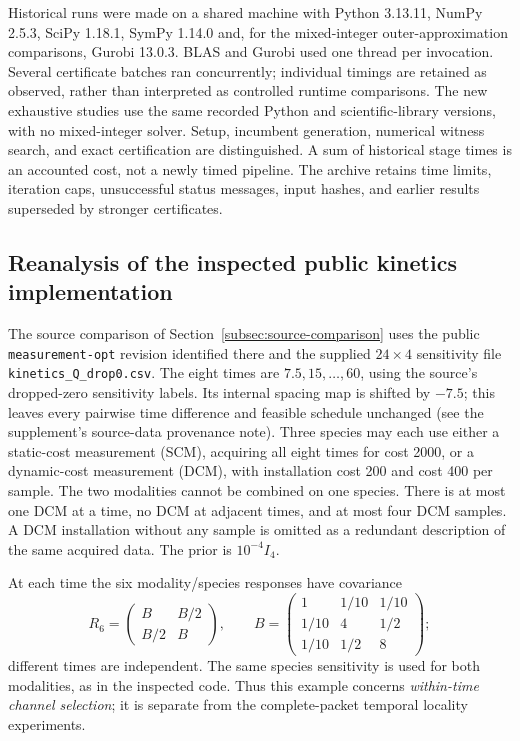 Historical runs were made on a shared machine with Python 3.13.11,
NumPy 2.5.3, SciPy 1.18.1, SymPy 1.14.0 and, for the mixed-integer
outer-approximation comparisons, Gurobi 13.0.3. BLAS and Gurobi used one thread
per invocation. Several certificate batches ran concurrently; individual
timings are retained as observed, rather than interpreted as controlled runtime
comparisons. The new exhaustive studies use the same recorded Python and
scientific-library versions, with no mixed-integer solver. Setup, incumbent
generation, numerical witness search, and exact certification are distinguished.
A sum of historical stage times is an accounted cost, not a newly timed pipeline.
The archive retains time limits, iteration caps, unsuccessful status messages,
input hashes, and earlier results superseded by stronger certificates.

\subsection{Reanalysis of the inspected public kinetics implementation}
\label{subsec:source-computation}

The source comparison of Section~\ref{subsec:source-comparison} uses the public
\texttt{measurement-opt} revision identified there and the supplied
$24\times4$ sensitivity file \texttt{kinetics\_Q\_drop0.csv}.
The eight times are $7.5,15,\ldots,60$, using the source's dropped-zero
sensitivity labels. Its internal spacing map is shifted by $-7.5$; this
leaves every pairwise time difference and feasible schedule unchanged
(see the supplement's source-data provenance note).
Three species may each use either a
static-cost measurement (SCM), acquiring all eight times for cost 2000,
or a dynamic-cost measurement (DCM), with installation cost 200 and cost 400 per
sample. The two modalities cannot be combined on one species. There is at
most one DCM at a time, no DCM at adjacent times, and at most four DCM samples.
A DCM installation without any sample is omitted as a redundant description
of the same acquired data. The prior is $10^{-4}I_4$.

At each time the six modality/species responses have covariance
\[
 R_6=\begin{pmatrix}B&B/2\\B/2&B\end{pmatrix},\qquad
 B=\begin{pmatrix}1&1/10&1/10\\1/10&4&1/2\\1/10&1/2&8\end{pmatrix};
\]
different times are independent. The same species sensitivity is used for
both modalities, as in the inspected code. Thus this example concerns
\emph{within-time channel selection}; it is separate from the complete-packet
temporal locality experiments.

